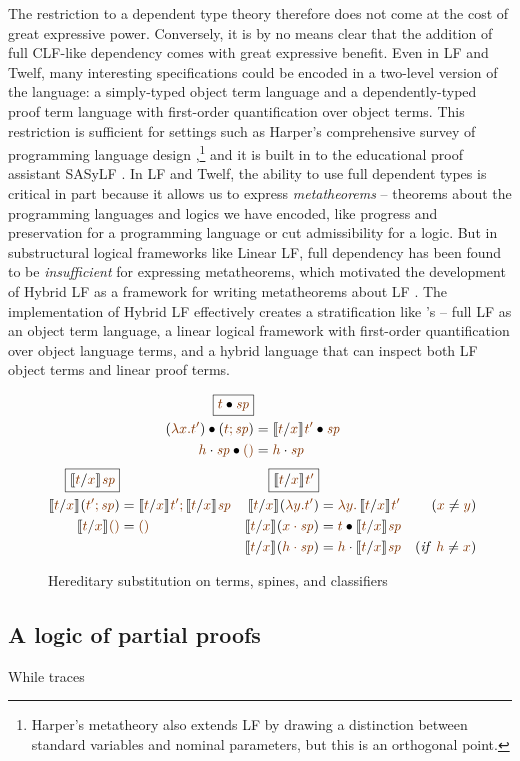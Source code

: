 The restriction to a dependent type theory therefore does not come at
the cost of great expressive power. Conversely, it is by no means
clear that the addition of full CLF-like dependency comes with great
expressive benefit. Even in LF and Twelf, many interesting
specifications could be encoded in a two-level version of the
language: a simply-typed object term language and a dependently-typed
proof term language with first-order quantification over object
terms. This restriction is sufficient for settings such as Harper's
comprehensive survey of programming language design
\cite{harper12practical},\footnote{Harper's metatheory also extends LF
  by drawing a distinction between standard variables and nominal
  parameters, but this is an orthogonal point.} and it is built in to
the educational proof assistant SASyLF \cite{aldrich08sasylf}. In LF
and Twelf, the ability to use full dependent types is critical in part
because it allows us to express {\it metatheorems} -- theorems about
the programming languages and logics we have encoded, like progress
and preservation for a programming language or cut admissibility for a
logic. But in substructural logical frameworks like Linear LF, full
dependency has been found to be {\it insufficient} for expressing
metatheorems, which motivated the development of Hybrid LF as a
framework for writing metatheorems about LF \cite{reed09hybrid}. The
implementation of Hybrid LF effectively creates a stratification like
\sls's -- full LF as an object term language, a linear logical
framework with first-order quantification over object language terms,
and a hybrid language that can inspect both LF object terms and linear
proof terms. 

\begin{figure}[t]
\begin{align*}
\fbox{$\subst{\lf{t}}{\lf{\spi}}$}
\\
\subst{(\lf{\lambda x. t'})}{(\lf{t; \spi})}
 & = \subst{\rsubst{\lf{t}}{\lf{x}}{\lf{t'}}}{\lf{\spi}}
\\
\subst{\lfroot{\lf h}{\spi}}{\lfnil}
 & = \lfroot{\lf h}{\spi}
\end{align*}\begin{align*}
\fbox{$\rsubst{\lf{t}}{\lf{x}}{\lf{\spi}}$}&
&
\fbox{$\rsubst{\lf{t}}{\lf{x}}{\lf{t'}}$}&
&
\\
\rsubst{\lf t}{\lf x}{(\lf{t'; \spi})}
 & = \lf{\no{\rsubst{\lf t}{\lf x}{\lf{t'}}}; 
         \no{\rsubst{\lf t}{\lf x}{\lf{\spi}}}} &
\rsubst{\lf t}{\lf x}(\lf{\lambda y. t'})
 & = \lf{\lambda y.\, \no{\rsubst{\lf t}{\lf x}{\lf{t'}}}} 
      & (\lf x \neq \lf y) 
\\
\rsubst{\lf t}{\lf x}{\lfnil} 
 & = \lfnil &
\rsubst{\lf t}{\lf x}{(\lf{\lfroot{x}{\spi}})}
 & = \subst{\lf t}{\rsubst{\lf t}{\lf x}{\lf{\spi}}}
\\
& & 
\rsubst{\lf t}{\lf x}{(\lf{\lfroot{h}{\spi}})}
 & = \lfroot{\lf h}{\no{\rsubst{\lf t}{\lf x}{\lf{\spi}}}}
      & ({\it if}~ \lf{h} \neq \lf{x})
\end{align*}
\caption{Hereditary substitution on terms, spines, and classifiers}
\label{fig:lf-hsubst}
\end{figure}

\subsection{A logic of partial proofs}

While traces 
